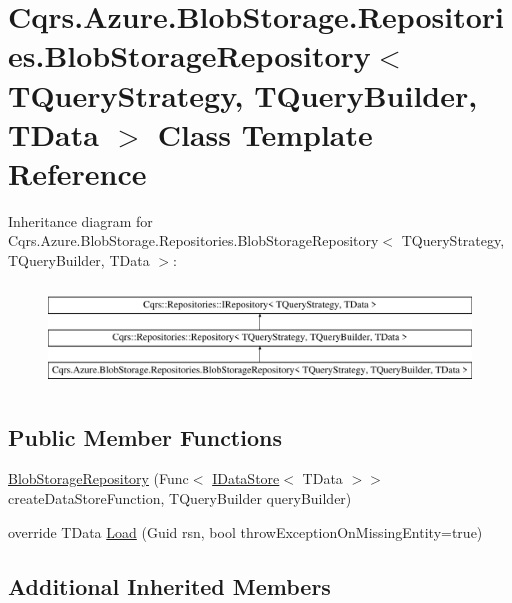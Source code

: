 \hypertarget{classCqrs_1_1Azure_1_1BlobStorage_1_1Repositories_1_1BlobStorageRepository}{}\section{Cqrs.\+Azure.\+Blob\+Storage.\+Repositories.\+Blob\+Storage\+Repository$<$ T\+Query\+Strategy, T\+Query\+Builder, T\+Data $>$ Class Template Reference}
\label{classCqrs_1_1Azure_1_1BlobStorage_1_1Repositories_1_1BlobStorageRepository}
Inheritance diagram for Cqrs.\+Azure.\+Blob\+Storage.\+Repositories.\+Blob\+Storage\+Repository$<$ T\+Query\+Strategy, T\+Query\+Builder, T\+Data $>$\+:\begin{figure}[H]
\begin{center}
\leavevmode
\includegraphics[height=2.749591cm]{classCqrs_1_1Azure_1_1BlobStorage_1_1Repositories_1_1BlobStorageRepository}
\end{center}
\end{figure}
\subsection*{Public Member Functions}
\begin{DoxyCompactItemize}
\item 
\hyperlink{classCqrs_1_1Azure_1_1BlobStorage_1_1Repositories_1_1BlobStorageRepository_a11ec03d2f22e21b2a84556fd26077909_a11ec03d2f22e21b2a84556fd26077909}{Blob\+Storage\+Repository} (Func$<$ \hyperlink{interfaceCqrs_1_1DataStores_1_1IDataStore}{I\+Data\+Store}$<$ T\+Data $>$$>$ create\+Data\+Store\+Function, T\+Query\+Builder query\+Builder)
\item 
override T\+Data \hyperlink{classCqrs_1_1Azure_1_1BlobStorage_1_1Repositories_1_1BlobStorageRepository_a7c5a3ca4d92cf4954508fb3e583eb49e_a7c5a3ca4d92cf4954508fb3e583eb49e}{Load} (Guid rsn, bool throw\+Exception\+On\+Missing\+Entity=true)
\end{DoxyCompactItemize}
\subsection*{Additional Inherited Members}


